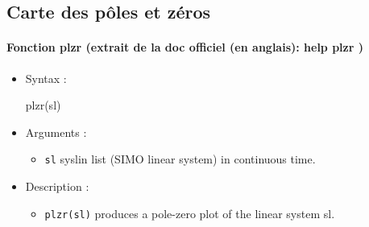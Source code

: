 \subsection{Carte des pôles et zéros}
\begin{doc}
\paragraph{Fonction plzr (extrait de la doc officiel (en anglais): help plzr )}
\begin{itemize}
    \item Syntax :
\begin{Scilabcode}
plzr(sl)
\end{Scilabcode}
    \item Arguments :
    \begin{itemize}
        \item \verb?sl? syslin list (SIMO linear system) in continuous time.
    \end{itemize}
    \item Description :
    \begin{itemize}
        \item \verb?plzr(sl)? produces a pole-zero plot of the linear system sl.
    \end{itemize}
\end{itemize}
\end{doc}
